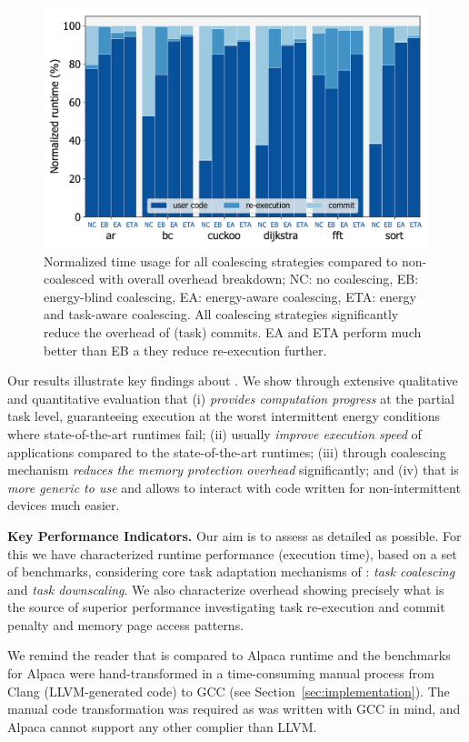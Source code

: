 \begin{figure}
	\centering
	\includegraphics[width=0.5\columnwidth]{figures/coalEfficiency}
	\caption{Normalized \sys time usage for all coalescing strategies compared to non-coalesced \sys with overall \sys overhead breakdown; NC: no coalescing, EB: energy-blind coalescing, EA: energy-aware coalescing, ETA: energy and task-aware coalescing. All \sys coalescing strategies significantly reduce the overhead of (task) commits. EA and ETA perform much better than EB a they reduce re-execution further.}
	\label{fig:overallOverheadBreakdown}
\end{figure}

Our results illustrate key findings about \sys. We show through extensive qualitative and quantitative evaluation that (i) \sys \emph{provides computation progress} at the partial task level, guaranteeing execution at the worst intermittent energy conditions where state-of-the-art runtimes fail; (ii) usually \emph{improve execution speed} of applications compared to the state-of-the-art runtimes; (iii) \sys through coalescing mechanism \emph{reduces the memory protection overhead} significantly; and (iv) that \sys is \emph{more generic to use} and allows to interact with code written for non-intermittent devices much easier. 

\textbf{Key Performance Indicators.} Our aim is to assess \sys as detailed as possible. For this we have characterized \sys runtime performance (execution time), based on a set of benchmarks, considering core task adaptation mechanisms of \sys: \emph{task coalescing} and \emph{task downscaling}. We also characterize \sys overhead showing precisely what is the source of \sys superior performance investigating task re-execution and commit penalty and memory page access patterns.

We remind the reader that \sys is compared to Alpaca runtime and the benchmarks for Alpaca were hand-transformed in a time-consuming manual process from Clang (LLVM-generated code) to GCC (see Section~\ref{sec:implementation}). The manual code transformation was required as \sys was written with GCC in mind, and Alpaca cannot support any other complier than LLVM.

